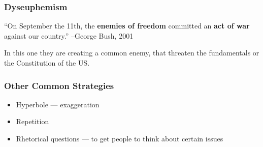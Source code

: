 \documentclass[../main.tex]{subfiles}
\begin{document}
			\subsubsection{Dyseuphemism}
				``On September the 11th, the \textbf{enemies of freedom} committed an \textbf{act of war} against our country.'' --George Bush, 2001 \par
				In this one they are creating a common enemy, that threaten the fundamentals or the Constitution of the US.

			\subsubsection{Other Common Strategies}
				\begin{itemize}
					\item Hyperbole --- exaggeration 
					\item Repetition
					\item Rhetorical questions --- to get people to think about certain issues
				\end{itemize}

\end{document}
